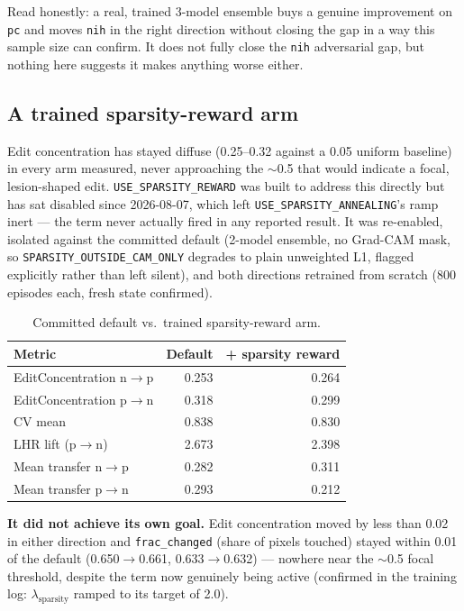 \documentclass[11pt]{article}
\begin{document}
Read honestly: a real, trained 3-model ensemble buys a genuine
improvement on \texttt{pc} and moves \texttt{nih} in the right direction
without closing the gap in a way this sample size can confirm. It does
not fully close the \texttt{nih} adversarial gap, but nothing here
suggests it makes anything worse either.

\subsection{A trained sparsity-reward arm}
\label{sec:sparsity_retrain}

Edit concentration has stayed diffuse (0.25–0.32 against a 0.05 uniform
baseline) in every arm measured, never approaching the $\sim$0.5 that
would indicate a focal, lesion-shaped edit. \texttt{USE\_SPARSITY\_REWARD}
was built to address this directly but has sat disabled since 2026-08-07,
which left \texttt{USE\_SPARSITY\_ANNEALING}'s ramp inert — the term
never actually fired in any reported result. It was re-enabled, isolated
against the committed default (2-model ensemble, no Grad-CAM mask, so
\texttt{SPARSITY\_OUTSIDE\_CAM\_ONLY} degrades to plain unweighted L1,
flagged explicitly rather than left silent), and both directions
retrained from scratch (800 episodes each, fresh state confirmed).

\begin{table}[h]
\centering
\caption{Committed default vs.\ trained sparsity-reward arm.}
\label{tab:sparsity_results}
\begin{tabular}{@{}lrr@{}}
\toprule
\textbf{Metric} & \textbf{Default} & \textbf{+ sparsity reward} \\
\midrule
EditConcentration n$\to$p & 0.253 & 0.264 \\
EditConcentration p$\to$n & 0.318 & 0.299 \\
CV mean & 0.838 & 0.830 \\
LHR lift (p$\to$n) & 2.673 & 2.398 \\
Mean transfer n$\to$p & 0.282 & 0.311 \\
Mean transfer p$\to$n & 0.293 & 0.212 \\
\bottomrule
\end{tabular}
\end{table}

\textbf{It did not achieve its own goal.} Edit concentration moved by
less than 0.02 in either direction and \texttt{frac\_changed} (share of
pixels touched) stayed within 0.01 of the default (0.650$\to$0.661,
0.633$\to$0.632) — nowhere near the $\sim$0.5 focal threshold, despite
the term now genuinely being active (confirmed in the training log:
$\lambda_{\text{sparsity}}$ ramped to its target of 2.0).
\end{document}
